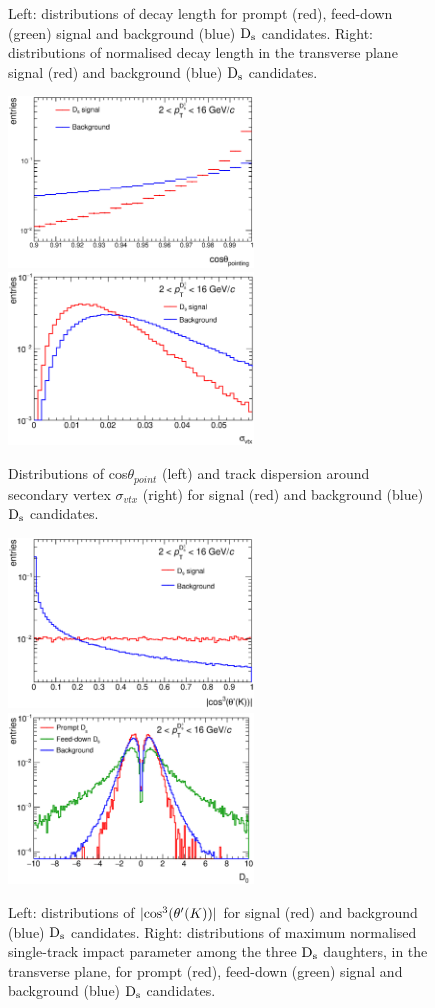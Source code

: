\begin{itemize}
\begin{figure}[!t]
\caption{Left: distributions of decay length for prompt (red), feed-down (green) signal and background (blue) ${\rm D_s}$ candidates. Right: distributions of normalised decay length in the transverse plane signal (red) and background (blue) ${\rm D_s}$ candidates.}
\label{fig:var1}
\end{figure}
\begin{figure}[!h]
\centering
\includegraphics[width=6.5cm]{FigCap4/cosP.eps}
\includegraphics[width=6.5cm]{FigCap4/sigVert.eps}
\caption{Distributions of cos$\theta_{point}$ (left) and track dispersion around secondary vertex $\sigma_{vtx}$ (right) for signal (red) and background (blue) ${\rm D_s}$ candidates.}
\label{fig:var2}
\end{figure}
\begin{figure}[!h]
\centering
\includegraphics[width=6.5cm]{FigCap4/CosPiKPhi3.eps}
\includegraphics[width=6.5cm]{FigCap4/normIP.eps}
\caption{Left: distributions of $|{\rm cos}^3(\theta'(K))|$ for signal (red) and background (blue) ${\rm D_s}$ candidates. Right: distributions of maximum normalised single-track impact parameter among the three ${\rm D_s}$ daughters, in the transverse plane, for prompt (red), feed-down (green) signal and background (blue) ${\rm D_s}$ candidates.}
\label{fig:var3}
\end{figure}


\end{itemize}
